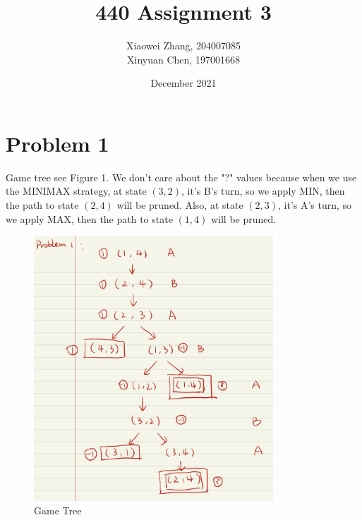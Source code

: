 \documentclass{article}
\title{440 Assignment 3}
\author{Xiaowei Zhang, 204007085 \\ Xinyuan Chen, 197001668}
\date{December 2021}
\begin{document}
\maketitle

\section*{Problem 1}
Game tree see Figure 1. We don't care about the "?" values because when we use the MINIMAX strategy, at state $(3,2)$, it's B's turn, so we apply MIN, then the path to state $(2,4)$ will be pruned. Also, at state $(2,3)$, it's A's turn, so we apply MAX, then the path to state $(1,4)$ will be pruned.
\begin{figure}
        \centering
        \includegraphics[width=0.8\textwidth]{problem1.jpg}
        \caption{Game Tree}
\end{figure}
\end{document}
